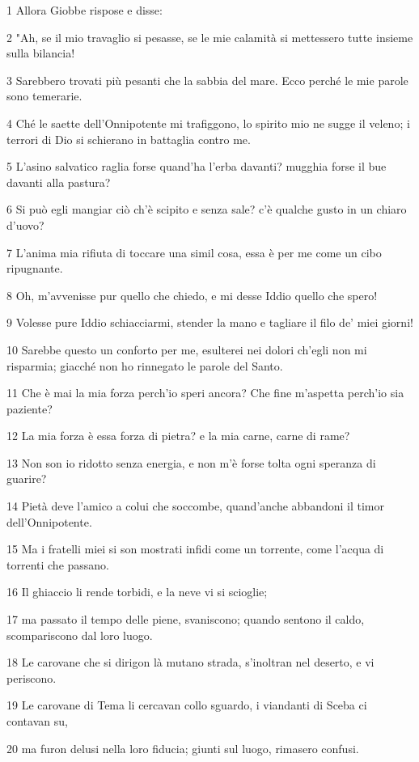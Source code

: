 \par 1 Allora Giobbe rispose e disse:
\par 2 "Ah, se il mio travaglio si pesasse, se le mie calamità si mettessero tutte insieme sulla bilancia!
\par 3 Sarebbero trovati più pesanti che la sabbia del mare. Ecco perché le mie parole sono temerarie.
\par 4 Ché le saette dell'Onnipotente mi trafiggono, lo spirito mio ne sugge il veleno; i terrori di Dio si schierano in battaglia contro me.
\par 5 L'asino salvatico raglia forse quand'ha l'erba davanti? mugghia forse il bue davanti alla pastura?
\par 6 Si può egli mangiar ciò ch'è scipito e senza sale? c'è qualche gusto in un chiaro d'uovo?
\par 7 L'anima mia rifiuta di toccare una simil cosa, essa è per me come un cibo ripugnante.
\par 8 Oh, m'avvenisse pur quello che chiedo, e mi desse Iddio quello che spero!
\par 9 Volesse pure Iddio schiacciarmi, stender la mano e tagliare il filo de' miei giorni!
\par 10 Sarebbe questo un conforto per me, esulterei nei dolori ch'egli non mi risparmia; giacché non ho rinnegato le parole del Santo.
\par 11 Che è mai la mia forza perch'io speri ancora? Che fine m'aspetta perch'io sia paziente?
\par 12 La mia forza è essa forza di pietra? e la mia carne, carne di rame?
\par 13 Non son io ridotto senza energia, e non m'è forse tolta ogni speranza di guarire?
\par 14 Pietà deve l'amico a colui che soccombe, quand'anche abbandoni il timor dell'Onnipotente.
\par 15 Ma i fratelli miei si son mostrati infidi come un torrente, come l'acqua di torrenti che passano.
\par 16 Il ghiaccio li rende torbidi, e la neve vi si scioglie;
\par 17 ma passato il tempo delle piene, svaniscono; quando sentono il caldo, scompariscono dal loro luogo.
\par 18 Le carovane che si dirigon là mutano strada, s'inoltran nel deserto, e vi periscono.
\par 19 Le carovane di Tema li cercavan collo sguardo, i viandanti di Sceba ci contavan su,
\par 20 ma furon delusi nella loro fiducia; giunti sul luogo, rimasero confusi.
